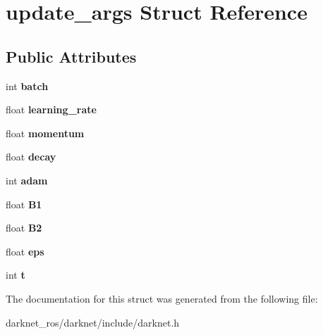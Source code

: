 \hypertarget{structupdate__args}{}\section{update\+\_\+args Struct Reference}
\label{structupdate__args}
\subsection*{Public Attributes}
\begin{DoxyCompactItemize}
\item 
\mbox{\label{structupdate__args_a1accceb722234c5aa3f38cc85c1d7cf7}} 
int {\bfseries batch}
\item 
\mbox{\label{structupdate__args_a3a0145d580360b2ffae2879af7e68c67}} 
float {\bfseries learning\+\_\+rate}
\item 
\mbox{\label{structupdate__args_abc35ad880888473f137cb9744e874870}} 
float {\bfseries momentum}
\item 
\mbox{\label{structupdate__args_a9eb5a4b5663dca4b69a13a19da674f19}} 
float {\bfseries decay}
\item 
\mbox{\label{structupdate__args_ab246da6c016ed395f727ab4f12df6e7d}} 
int {\bfseries adam}
\item 
\mbox{\label{structupdate__args_a1822b0d844c349135590f3583415faec}} 
float {\bfseries B1}
\item 
\mbox{\label{structupdate__args_ad4542261082ee829820f2d6a750021f6}} 
float {\bfseries B2}
\item 
\mbox{\label{structupdate__args_a7a173936c93e7424d77347cfa9ab3f2f}} 
float {\bfseries eps}
\item 
\mbox{\label{structupdate__args_addc09d90e7323fc19a4e04b0612ef10b}} 
int {\bfseries t}
\end{DoxyCompactItemize}


The documentation for this struct was generated from the following file\+:\begin{DoxyCompactItemize}
\item 
darknet\+\_\+ros/darknet/include/darknet.\+h\end{DoxyCompactItemize}
